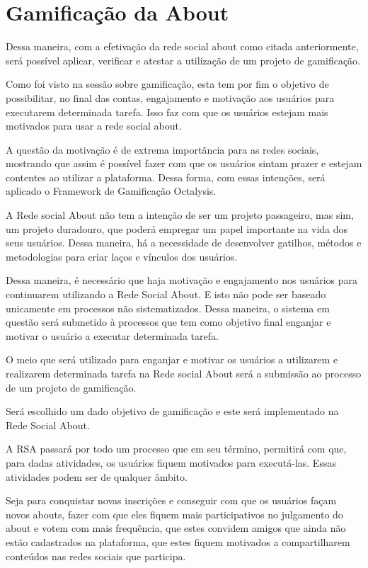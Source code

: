 \section{Gamificação da About}
\label{sub:gamifição}
Dessa maneira, com a efetivação da rede social about como citada anteriormente, será possível aplicar, verificar e
atestar a utilização de um projeto de gamificação.

Como foi visto na sessão sobre gamificação, esta tem por fim o objetivo de 
possibilitar, no final das contas, engajamento e motivação aos usuários para
executarem determinada tarefa. Isso faz com que os usuários estejam mais
motivados para usar a rede social about. 

A questão da motivação é de extrema importância para as redes sociais, mostrando
que assim é possível fazer com que os usuários sintam prazer e estejam
contentes ao utilizar a plataforma. Dessa forma, com essas intenções,
será aplicado o Framework de Gamificação Octalysis.

A Rede social About não tem a intenção de ser um projeto passageiro, mas sim,
um projeto duradouro, que poderá empregar um papel importante na vida dos
seus usuários. Dessa maneira, há a necessidade de desenvolver gatilhos, métodos
e metodologias para criar laços e vínculos dos usuários.

Dessa maneira, é necessário que haja motivação e engajamento nos usuários para 
continuarem utilizando a Rede Social About. E isto não pode ser baseado unicamente
em processos não sistematizados. Dessa maneira, o sistema em questão será
submetido à processos que tem como objetivo final enganjar e motivar o usuário
a executar determinada tarefa.

O meio que será utilizado para enganjar e motivar os usuários a utilizarem e
realizarem determinada tarefa na Rede social About será a submissão ao processo
de um projeto de gamificação. 

Será escolhido um dado objetivo de gamificação e este será implementado na Rede
Social About.

A RSA passará por todo um processo que em seu término, permitirá com que,
para dadas atividades, os usuários fiquem motivados para executá-las. Essas
atividades podem ser de qualquer âmbito. 

Seja para conquistar novas inscrições e
conseguir com que os usuários façam novos abouts, fazer com que eles fiquem mais
participativos no julgamento do about e votem com mais frequência, que estes
convidem amigos que ainda não estão cadastrados na plataforma, que estes fiquem
motivados a compartilharem conteúdos nas redes sociais que participa.

